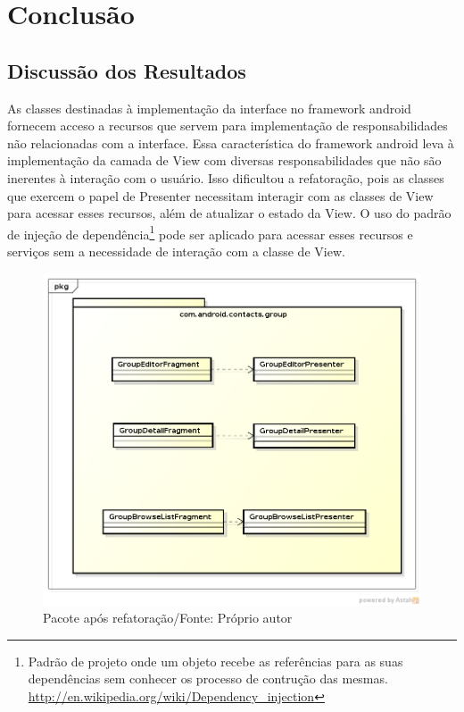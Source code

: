 \chapter{Conclusão} 

\section{Discussão dos Resultados} 
As classes destinadas à implementação da interface no framework android fornecem
acceso a recursos que servem para implementação de responsabilidades não
relacionadas com a interface. Essa característica do framework android leva à
implementação da camada de View com diversas responsabilidades que não são
inerentes à interação com o usuário. Isso dificultou a refatoração, pois as
classes que exercem o papel de Presenter necessitam interagir com as classes de
View para acessar esses recursos, além de atualizar o estado da View. O uso do
padrão de injeção de
dependência\footnote{Padrão
de projeto onde um objeto recebe as referências para as suas dependências sem
conhecer os processo de contrução das mesmas.
\url{http://en.wikipedia.org/wiki/Dependency_injection}}
pode ser aplicado para acessar esses recursos e serviços sem a necessidade de
interação com a classe de View.


\begin{figure}[h]
	\centering
	\label{fig:classes_iteracao3}
	\includegraphics[scale=0.5]{img/classes_iteracao3}
	\caption{Pacote após refatoração/Fonte: Próprio autor}
\end{figure}


